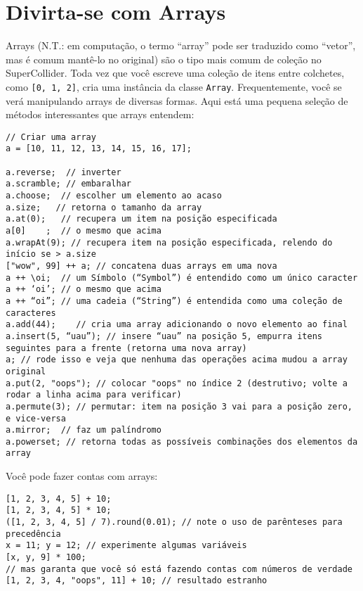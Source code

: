 \section{Divirta-se com Arrays}
\label{sec:arrays}

Arrays (N.T.: em computação, o termo “array” pode ser traduzido como “vetor”, mas é comum mantê-lo no original) são o tipo mais comum de coleção no SuperCollider. Toda vez que você escreve uma coleção de itens entre colchetes, como \texttt{[0, 1, 2]}, cria uma instância da classe \texttt{Array}. Frequentemente, você se verá manipulando arrays de diversas formas. Aqui está uma pequena seleção de métodos interessantes que arrays entendem:

 
\begin{lstlisting}[style=SuperCollider-IDE, basicstyle=\scttfamily\footnotesize]
// Criar uma array
a = [10, 11, 12, 13, 14, 15, 16, 17];

a.reverse;  // inverter
a.scramble; // embaralhar
a.choose;  // escolher um elemento ao acaso
a.size;	  // retorna o tamanho da array
a.at(0);   // recupera um item na posição especificada
a[0]	;  // o mesmo que acima
a.wrapAt(9); // recupera item na posição especificada, relendo do início se > a.size
["wow", 99] ++ a; // concatena duas arrays em uma nova
a ++ \oi;  // um Símbolo (“Symbol”) é entendido como um único caracter
a ++ ‘oi’; // o mesmo que acima
a ++ “oi”; // uma cadeia (“String”) é entendida como uma coleção de caracteres
a.add(44);    // cria uma array adicionando o novo elemento ao final
a.insert(5, “uau”); // insere “uau” na posição 5, empurra itens seguintes para a frente (retorna uma nova array)
a; // rode isso e veja que nenhuma das operações acima mudou a array original
a.put(2, "oops"); // colocar "oops" no índice 2 (destrutivo; volte a rodar a linha acima para verificar)
a.permute(3); // permutar: item na posição 3 vai para a posição zero, e vice-versa
a.mirror;  // faz um palíndromo
a.powerset; // retorna todas as possíveis combinações dos elementos da array
\end{lstlisting}
 

Você pode fazer contas com arrays:

 
\begin{lstlisting}[style=SuperCollider-IDE, basicstyle=\scttfamily\footnotesize]
[1, 2, 3, 4, 5] + 10;
[1, 2, 3, 4, 5] * 10;
([1, 2, 3, 4, 5] / 7).round(0.01); // note o uso de parênteses para precedência
x = 11; y = 12; // experimente algumas variáveis
[x, y, 9] * 100;
// mas garanta que você só está fazendo contas com números de verdade
[1, 2, 3, 4, "oops", 11] + 10; // resultado estranho
\end{lstlisting}
 

